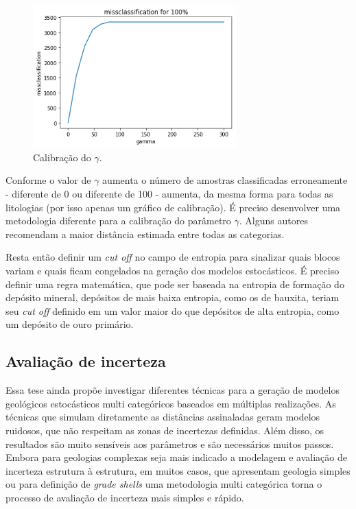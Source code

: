 \begin{figure}[H]
	\caption{\label{calib_gamma}Calibração do $\gamma$.}
	\begin{center}
		\includegraphics[width=0.7\textwidth]{capitulo_3/calib100.png}
	\end{center}
\end{figure}

Conforme o valor de $\gamma$ aumenta o número de amostras classificadas erroneamente - diferente de 0 ou diferente de 100 - aumenta, da mesma forma para todas as litologias (por isso apenas um gráfico de calibração). É preciso desenvolver uma metodologia diferente para a calibração do parâmetro $\gamma$. Alguns autores recomendam a maior distância estimada entre todas as categorias.

Resta então definir um \textit{cut off} no campo de entropia para sinalizar quais blocos variam e quais ficam congelados na geração dos modelos estocásticos. É preciso definir uma regra matemática, que pode ser baseada na entropia de formação do depósito mineral, depósitos de mais baixa entropia, como os de bauxita, teriam seu \textit{cut off} definido em um valor maior do que depósitos de alta entropia, como um depósito de ouro primário.

\subsection{Avaliação de incerteza}

Essa tese ainda propõe investigar diferentes técnicas para a geração de modelos geológicos estocásticos multi categóricos baseados em múltiplas realizações. As técnicas que simulam diretamente as distâncias assinaladas geram modelos ruidosos, que não respeitam as zonas de incertezas definidas. Além disso, os resultados são muito sensíveis aos parâmetros e são necessários muitos passos. Embora para geologias complexas seja mais indicado a modelagem e avaliação de incerteza estrutura à estrutura, em muitos casos, que apresentam geologia simples ou para definição de \textit{grade shells} uma metodologia multi categórica torna o processo de avaliação de incerteza mais simples e rápido.


